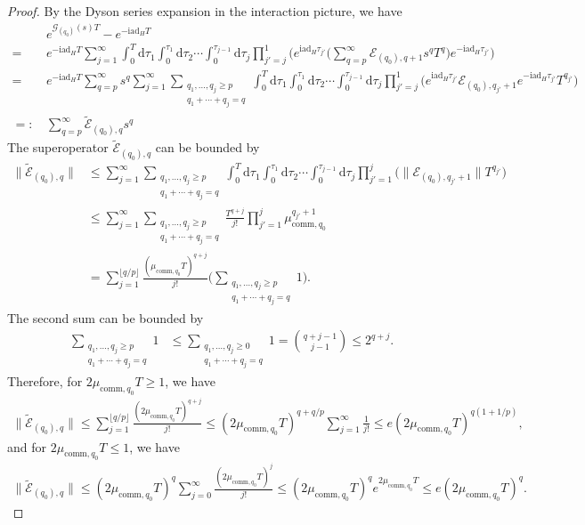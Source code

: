 \documentclass[11pt]{article}
\renewcommand{\i}{\mathrm{i}}
\renewcommand{\d}{\mathrm{d}}
\newcommand{\ad}{\mathrm{ad}}
\newcommand{\G}{\mathcal{G}}
\newcommand{\E}{\mathcal{E}}
\begin{document}
\begin{proof}
By the Dyson series expansion in the interaction picture, we have 
\begin{align*}
    &e^{\G_{(q_0)}(s) T}-e^{-\i \ad_H T} \\
    = \ & e^{-\i \ad_H T}  \sum_{j=1}^{\infty} \int_{0}^T \d \tau_1 \int_{0}^{\tau_1}\d \tau_2 \cdots \int_{0}^{\tau_{j-1}}\d \tau_j \prod_{j'=j}^{1}\bigg(e^{\i\ad_H \tau_{j'}}\bigg(\sum_{q=p}^{\infty}\E_{(q_0),q+1}s^qT^q\bigg)e^{-\i \ad_H \tau_{j'}}\bigg) \\
    = \ &  e^{-\i \ad_H T}\sum_{q=p}^{\infty}s^{q} \sum_{j=1}^{\infty} \sum_{\substack{q_1,\ldots,q_j \ge p \\ q_1+\cdots+q_j=q}} \int_{0}^T \d \tau_1 \int_{0}^{\tau_1}\d \tau_2 \cdots \int_{0}^{\tau_{j-1}}\d \tau_j \prod_{j'=j}^{1}\bigg(e^{\i\ad_H \tau_{j'}}\E_{(q_0),q_{j'}+1}e^{-\i \ad_H \tau_{j'}}T^{q_{j'}}\bigg)\\
    =:\,& \sum_{q=p}^{\infty}\tilde{\E}_{(q_0),q} s^q   
\end{align*}
The superoperator $\tilde{\E}_{(q_0),q}$ can be bounded by \begin{align*}
    \big\|\tilde{\E}_{(q_0),q}\big\|&\le \sum_{j=1}^{\infty} \sum_{\substack{q_1,\ldots,q_j \ge p \\ q_1+\cdots+q_j=q}} \int_{0}^T \d \tau_1 \int_{0}^{\tau_1}\d \tau_2 \cdots \int_{0}^{\tau_{j-1}}\d \tau_j \prod_{j'=1}^{j}\big(\big\|\E_{(q_0),q_{j'}+1}\big\|T^{q_{j'}}\big) \\
    &\le  \sum_{j=1}^{\infty} \sum_{\substack{q_1,\ldots,q_j \ge p \\ q_1+\cdots+q_j=q}}\frac{T^{q+j}}{j!}\prod_{j'=1}^{j}\mu_{\mathrm{comm},q_0}^{q_{j'}+1} \\
    &=\sum_{j=1}^{\lfloor q/p\rfloor }\frac{(\mu_{\mathrm{comm},q_0}T)^{q+j}}{j!}\Big(\sum_{\substack{q_1,\ldots,q_j \ge p \\ q_1+\cdots+q_j=q}} 1\Big).
\end{align*}
The second sum can be bounded by \begin{align*}
    \sum_{\substack{q_1,\ldots,q_j \ge p \\ q_1+\cdots+q_j=q}} 1 &\le \sum_{\substack{ q_1,\ldots,q_j \ge 0 \\ q_1+\cdots+q_j=q}} 1=\binom{q+j-1}{j-1} \le 2^{q+j}.
\end{align*}
Therefore, for $2\mu_{\mathrm{comm},q_0}T\ge 1$, we have \begin{align*}
    \big\|\tilde{\E}_{(q_0),q}\big\|\le \sum_{j=1}^{\lfloor q/p\rfloor }\frac{(2\mu_{\mathrm{comm},q_0}T)^{q+j}}{j!} 
    \le (2\mu_{\mathrm{comm},q_0}T)^{q+q/p}\sum_{j=1}^{\infty}\frac{1}{j!}\le e(2\mu_{\mathrm{comm},q_0}T)^{q(1+1/p)} ,
\end{align*}
and for $2\mu_{\mathrm{comm},q_0}T\le 1$, we have \begin{align*}
    \big\|\tilde{\E}_{(q_0),q}\big\| \le (2\mu_{\mathrm{comm},q_0}T)^{q}\sum_{j=0}^{\infty}\frac{ (2\mu_{\mathrm{comm},q_0}T)^{j}}{j!}\le (2\mu_{\mathrm{comm},q_0}T)^{q} e^{2\mu_{\mathrm{comm},q_0}T}\le e(2\mu_{\mathrm{comm},q_0}T)^{q}.
\end{align*}
\end{proof}
\end{document}

